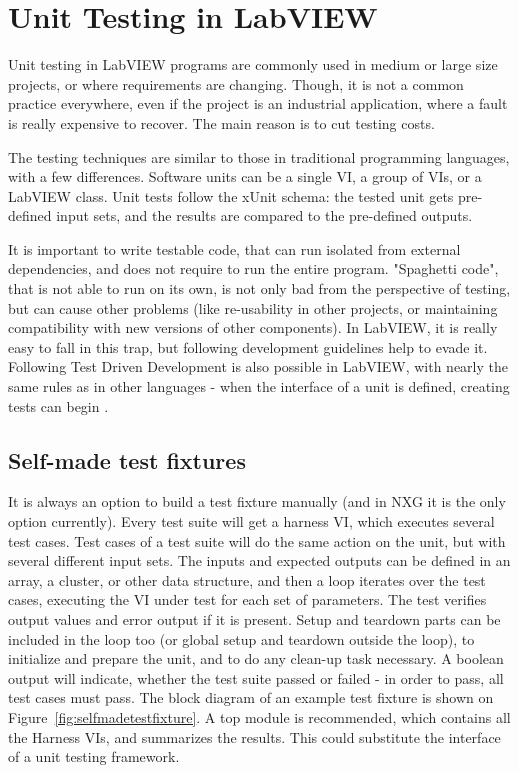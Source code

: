\chapter{Unit Testing in LabVIEW}

Unit testing in LabVIEW programs are commonly used in medium or large size projects, or where requirements are changing. Though, it is not a common practice everywhere, even if the project is an industrial application, where a fault is really expensive to recover. The main reason is to cut testing costs.

The testing techniques are similar to those in traditional programming languages, with a few differences. Software units can be a single VI, a group of VIs, or a LabVIEW class. Unit tests follow the xUnit schema: the tested unit gets pre-defined input sets, and the results are compared to the pre-defined outputs.

It is important to write testable code, that can run isolated from external dependencies, and does not require to run the entire program. "Spaghetti code", that is not able to run on its own, is not only bad from the perspective of testing, but can cause other problems (like re-usability in other projects, or maintaining compatibility with new versions of other components). In LabVIEW, it is really easy to fall in this trap, but following development guidelines help to evade it. Following Test Driven Development is also possible in LabVIEW, with nearly the same rules as in other languages - when the interface of a unit is defined, creating tests can begin \cite{delacor_ni2014}. 

\section{Self-made test fixtures}
It is always an option to build a test fixture manually (and in NXG it is the only option currently). Every test suite will get a harness VI, which executes several test cases. Test cases of a test suite will do the same action on the unit, but with several different input sets. The inputs and expected outputs can be defined in an array, a cluster, or other data structure, and then a loop iterates over the test cases, executing the VI under test for each set of parameters. The test verifies output values and error output if it is present. Setup and teardown parts can be included in the loop too (or global setup and teardown outside the loop), to initialize and prepare the unit, and to do any clean-up task necessary. A boolean output will indicate, whether the test suite passed or failed - in order to pass, all test cases must pass. The block diagram of an example test fixture is shown on Figure~\ref{fig:selfmadetestfixture}.
A top module is recommended, which contains all the Harness VIs, and summarizes the results. This could substitute the interface of a unit testing framework. 

